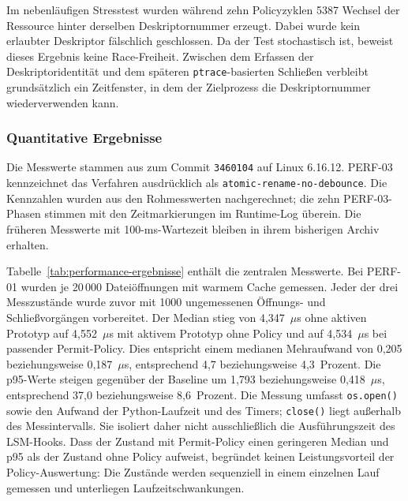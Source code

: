 Im nebenläufigen Stresstest wurden während zehn Policyzyklen 5387 Wechsel der Ressource hinter
derselben Deskriptornummer erzeugt. Dabei wurde kein erlaubter Deskriptor fälschlich geschlossen.
Da der Test stochastisch ist, beweist dieses Ergebnis keine Race-Freiheit. Zwischen dem Erfassen
der Deskriptoridentität und dem späteren \texttt{ptrace}-basierten Schließen verbleibt grundsätzlich
ein Zeitfenster, in dem der Zielprozess die Deskriptornummer wiederverwenden kann.

\subsubsection{Quantitative Ergebnisse}

Die Messwerte stammen aus 
zum Commit \texttt{3460104} auf Linux 6.16.12. PERF-03 kennzeichnet das Verfahren ausdrücklich
als \texttt{atomic-rename-no-debounce}. Die Kennzahlen wurden aus den Rohmesswerten nachgerechnet;
die zehn PERF-03-Phasen stimmen mit den Zeitmarkierungen im Runtime-Log überein.
Die früheren Messwerte mit 100-ms-Wartezeit bleiben in ihrem bisherigen Archiv erhalten.

Tabelle~\ref{tab:performance-ergebnisse} enthält die zentralen Messwerte. Bei PERF-01 wurden je
20\,000 Dateiöffnungen mit warmem Cache gemessen. Jeder der drei Messzustände wurde zuvor
mit 1000 ungemessenen Öffnungs- und Schließvorgängen vorbereitet. Der Median stieg von
4,347~$\mu$s ohne aktiven Prototyp auf 4,552~$\mu$s mit aktivem Prototyp ohne Policy und auf
4,534~$\mu$s bei passender Permit-Policy. Dies entspricht einem medianen Mehraufwand von
0,205 beziehungsweise 0,187~$\mu$s, entsprechend 4,7 beziehungsweise 4,3~Prozent.
Die p95-Werte steigen gegenüber der Baseline um 1,793 beziehungsweise 0,418~$\mu$s,
entsprechend 37,0 beziehungsweise 8,6~Prozent. Die Messung umfasst \texttt{os.open()} sowie den Aufwand der
Python-Laufzeit und des Timers; \texttt{close()} liegt außerhalb des Messintervalls. Sie isoliert
daher nicht ausschließlich die Ausführungszeit des LSM-Hooks. Dass der Zustand mit Permit-Policy
einen geringeren Median und p95 als der Zustand ohne Policy aufweist, begründet keinen
Leistungsvorteil der Policy-Auswertung: Die Zustände werden sequenziell in einem einzelnen Lauf
gemessen und unterliegen Laufzeitschwankungen.

